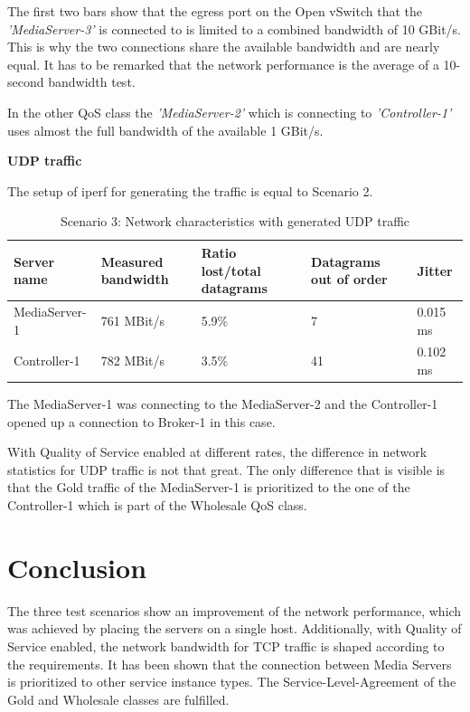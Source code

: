 The first two bars show that the egress port on the Open vSwitch that the \textit{'MediaServer-3'} is connected to is limited to a combined bandwidth of 10 GBit/s. This is why the two connections share the available bandwidth and are nearly equal. It has to be remarked that the network performance is the average of a 10-second bandwidth test.

In the other QoS class the \textit{'MediaServer-2'} which is connecting to \textit{'Controller-1'} uses almost the full bandwidth of the available 1 GBit/s.

\textbf{UDP traffic}

The setup of iperf for generating the traffic is equal to Scenario 2.

\begin{table}[H]
\centering

\begin{tabularx}{\textwidth}{ |X|X|X|X|X| }
\hline Server name & Measured bandwidth & Ratio lost/total datagrams & Datagrams out of order & Jitter \\ 
\hline MediaServer-1 & 761 MBit/s & 5.9\% & 7 & 0.015 ms\\ 
\hline Controller-1 & 782 MBit/s & 3.5\% & 41 & 0.102 ms \\ 
\hline 
\end{tabularx}

\caption{Scenario 3: Network characteristics with generated UDP traffic}
\end{table}

The MediaServer-1 was connecting to the MediaServer-2 and the Controller-1 opened up a connection to Broker-1 in this case.

With Quality of Service enabled at different rates, the difference in network statistics for UDP traffic is not that great. The only difference that is visible is that the Gold traffic of the MediaServer-1 is prioritized to the one of the Controller-1 which is part of the Wholesale QoS class.



\section{Conclusion}

The three test scenarios show an improvement of the network performance, which was achieved by placing the servers on a single host. Additionally, with Quality of Service enabled, the network bandwidth for TCP traffic is shaped according to the requirements. It has been shown that the connection between Media Servers is prioritized to other service instance types. The Service-Level-Agreement of the Gold and Wholesale classes are fulfilled.